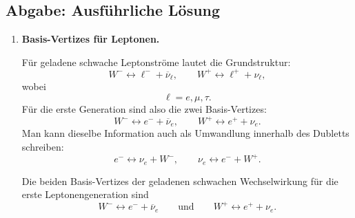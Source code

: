 \documentclass[11pt,a4paper]{scrartcl}
\theoremstyle{definition}
\theoremstyle{plain}
\theoremstyle{remark}
\begin{document}
\subsection{Abgabe: Ausf\"uhrliche L\"osung}

\begin{enumerate}[label=(\alph*)]
    \item \textbf{Basis-Vertizes f\"ur Leptonen.}

    \begin{calculationbox}
        Für geladene schwache Leptonströme lautet die Grundstruktur:
        \[
            W^- \leftrightarrow \ell^-+\overline{\nu}_\ell,
            \qquad
            W^+ \leftrightarrow \ell^+ + \nu_\ell,
        \]
        wobei
        \[
            \ell=e,\mu,\tau.
        \]
        Für die erste Generation sind also die zwei Basis-Vertizes:
        \[
            W^- \leftrightarrow e^-+\overline{\nu}_e,
            \qquad
            W^+ \leftrightarrow e^+ + \nu_e.
        \]
        Man kann dieselbe Information auch als Umwandlung innerhalb des Dubletts schreiben:
        \[
            e^- \leftrightarrow \nu_e + W^-,
            \qquad
            \nu_e \leftrightarrow e^- + W^+.
        \]
    \end{calculationbox}

    \begin{calculationbox}[title=Diagrammatische Darstellung]
    \begin{center}
    \end{center}
    \end{calculationbox}

    \begin{answerbox}
        Die beiden Basis-Vertizes der geladenen schwachen Wechselwirkung für die erste Leptonengeneration sind
        \[
            \boxed{W^- \leftrightarrow e^-+\overline{\nu}_e}
            \qquad\text{und}\qquad
            \boxed{W^+ \leftrightarrow e^+ + \nu_e}.
        \]
    \end{answerbox}


\end{enumerate}
\end{document}
